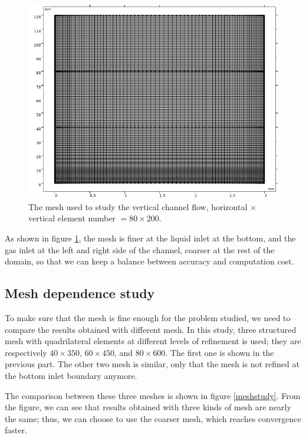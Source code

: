 \begin{figure}[H]
    \centering
    \includegraphics[width = \textwidth]{mesh.png}
    \caption{The mesh used to study the vertical channel flow, horizontal $\times$ vertical element number $ =  80  \times 200 $.}
    \label{mesh}
\end{figure}

As shown in figure \ref{mesh}, the mesh is finer at the liquid inlet at the bottom, and the gas inlet at the left and right side of the channel, coarser at the rest of the domain, so that we can keep a balance between accuracy and computation cost.

\subsection{Mesh dependence study}

To make sure that the mesh is fine enough for the problem studied, we need to compare the results obtained with different mesh. In this study, three structured mesh with quadrilateral elements at different levels of refinement is used; they are respectively $40 \times 350$, $60 \times 450$, and $80 \times 600$. The first one is shown in the previous part. The other two mesh is similar, only that the mesh is not refined at the bottom inlet boundary anymore.

The comparison between these three meshes is shown in figure \ref{meshstudy}. From the figure, we can see that results obtained with three kinds of mesh are nearly the same; thus, we can choose to use the coarser mesh, which reaches convergence faster.

